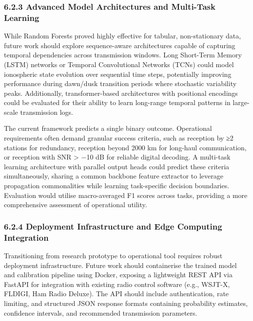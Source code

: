 \subsubsection{6.2.3 Advanced Model Architectures and Multi-Task
Learning}\label{advanced-model-architectures-and-multi-task-learning}

While Random Forests proved highly effective for tabular, non-stationary
data, future work should explore sequence-aware architectures capable of
capturing temporal dependencies across transmission windows. Long
Short-Term Memory (LSTM) networks or Temporal Convolutional Networks
(TCNs) could model ionospheric state evolution over sequential time
steps, potentially improving performance during dawn/dusk transition
periods where stochastic variability peaks. Additionally,
transformer-based architectures with positional encodings could be
evaluated for their ability to learn long-range temporal patterns in
large-scale transmission logs.

The current framework predicts a single binary outcome. Operational
requirements often demand granular success criteria, such as reception
by ≥2 stations for redundancy, reception beyond 2000 km for long-haul
communication, or reception with SNR \textgreater{} −10 dB for reliable
digital decoding. A multi-task learning architecture with parallel
output heads could predict these criteria simultaneously, sharing a
common backbone feature extractor to leverage propagation commonalities
while learning task-specific decision boundaries. Evaluation would
utilise macro-averaged F1 scores across tasks, providing a more
comprehensive assessment of operational utility.

\subsubsection{6.2.4 Deployment Infrastructure and Edge Computing
Integration}\label{deployment-infrastructure-and-edge-computing-integration}

Transitioning from research prototype to operational tool requires
robust deployment infrastructure. Future work should containerise the
trained model and calibration pipeline using Docker, exposing a
lightweight REST API via FastAPI for integration with existing radio
control software (e.g., WSJT-X, FLDIGI, Ham Radio Deluxe). The API
should include authentication, rate limiting, and structured JSON
response formats containing probability estimates, confidence intervals,
and recommended transmission parameters.

